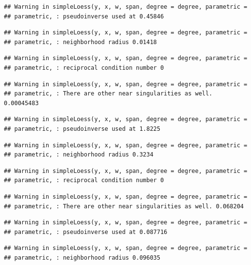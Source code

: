 \documentclass[]{article}
\begin{document}
\begin{verbatim}
## Warning in simpleLoess(y, x, w, span, degree = degree, parametric =
## parametric, : pseudoinverse used at 0.45846
\end{verbatim}

\begin{verbatim}
## Warning in simpleLoess(y, x, w, span, degree = degree, parametric =
## parametric, : neighborhood radius 0.01418
\end{verbatim}

\begin{verbatim}
## Warning in simpleLoess(y, x, w, span, degree = degree, parametric =
## parametric, : reciprocal condition number 0
\end{verbatim}

\begin{verbatim}
## Warning in simpleLoess(y, x, w, span, degree = degree, parametric =
## parametric, : There are other near singularities as well. 0.00045483
\end{verbatim}

\begin{verbatim}
## Warning in simpleLoess(y, x, w, span, degree = degree, parametric =
## parametric, : pseudoinverse used at 1.8225
\end{verbatim}

\begin{verbatim}
## Warning in simpleLoess(y, x, w, span, degree = degree, parametric =
## parametric, : neighborhood radius 0.3234
\end{verbatim}

\begin{verbatim}
## Warning in simpleLoess(y, x, w, span, degree = degree, parametric =
## parametric, : reciprocal condition number 0
\end{verbatim}

\begin{verbatim}
## Warning in simpleLoess(y, x, w, span, degree = degree, parametric =
## parametric, : There are other near singularities as well. 0.068204
\end{verbatim}

\begin{verbatim}
## Warning in simpleLoess(y, x, w, span, degree = degree, parametric =
## parametric, : pseudoinverse used at 0.087716
\end{verbatim}

\begin{verbatim}
## Warning in simpleLoess(y, x, w, span, degree = degree, parametric =
## parametric, : neighborhood radius 0.096035
\end{verbatim}
\end{document}
